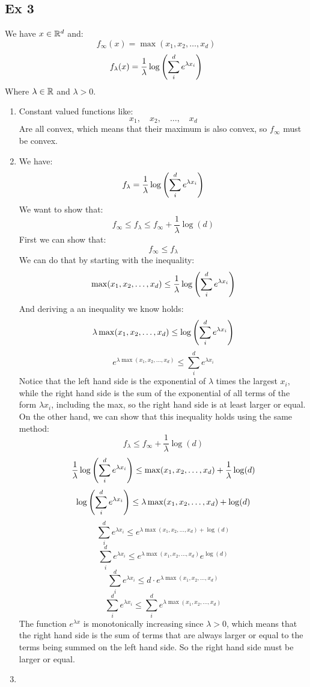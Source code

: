 \documentclass[12pt]{article}
\begin{document}
\subsection*{Ex 3}
We have $x \in \mathbb{R}^d$ and:
\[ f_\infty(x) = \max(x_1, x_2, \dots, x_d) \]
\[ f_\lambda(x) = \dfrac{1}{\lambda}
\log\left( \sum_{i}^d e^{\lambda x_i} \right) \]
Where $\lambda \in \mathbb{R}$ and $\lambda > 0$. 
\begin{enumerate}[label = \letters]
    \item 
    Constant valued functions like:
    \[ x_1, \quad x_2, \quad \dots, \quad x_d \]
    Are all convex, 
    which means that their maximum is also
    convex, so $f_\infty$ must be convex.
    \item 
    We have:
    \[ f_\lambda = \dfrac{1}{\lambda}
    \log\left( \sum_{i}^d e^{\lambda x_i} \right) \]
    We want to show that:
    \[ f_\infty \leq f_\lambda \leq  f_\infty 
    + \dfrac{1}{\lambda}\log(d) \]
    First we can show that:
    \[ f_\infty \leq  f_\lambda \]
    We can do that by starting with the
    inequality:
    \[ \max(x_1, x_2, \dots, x_d)
    \leq \dfrac{1}{\lambda}
    \log\left( \sum_{i}^d e^{\lambda x_i} \right) \]
    And deriving a an inequality we know holds:
    \[ \lambda \max(x_1, x_2, \dots, x_d)
    \leq \log\left( \sum_{i}^d e^{\lambda x_i} \right) \]
    \[ e^{\lambda \max(x_1, x_2, \dots, x_d)}
    \leq \sum_{i}^d e^{\lambda x_i} \]
    Notice that the left hand side
    is the exponential of $\lambda$
    times the largest $x_i$,
    while the right hand side is the sum
    of the exponential of all terms
    of the form $\lambda x_i$,
    including the max, so the right hand
    side is at least larger or equal. \\
    On the other hand, we can show that
    this inequality holds using the same method:
    \[ f_\lambda \leq  f_\infty 
    + \dfrac{1}{\lambda}\log(d) \]
    \[ \dfrac{1}{\lambda}
    \log\left( \sum_{i}^d e^{\lambda x_i} \right) 
    \leq \max(x_1, x_2, \dots, x_d)
    + \dfrac{1}{\lambda}\log(d) \]
    \[ \log\left( \sum_{i}^d e^{\lambda x_i} \right) 
    \leq \lambda \max(x_1, x_2, \dots, x_d) + \log(d) \]
    \[ \sum_{i}^d e^{\lambda x_i}
    \leq e^{\lambda \max(x_1, x_2, \dots, x_d) + \log(d)} \]
    \[ \sum_{i}^d e^{\lambda x_i}
    \leq e^{\lambda \max(x_1, x_2, \dots, x_d)}
    e^{\log(d)} \]
    \[ \sum_{i}^d e^{\lambda x_i}
    \leq d \cdot e^{\lambda\max(x_1, x_2, \dots, x_d)} \]
    \[ \sum_{i}^d  e^{\lambda x_i}
    \leq \sum_{i}^d e^{\lambda\max(x_1, x_2, \dots, x_d)} \]
    The function $e^{\lambda x}$
    is monotonically increasing since $\lambda > 0$,
    which means that the right hand side
    is the sum of terms that are always larger or
    equal to the terms being summed on the left hand side.
    So the right hand side must be larger or equal.
    \item
\end{enumerate}
\end{document}
